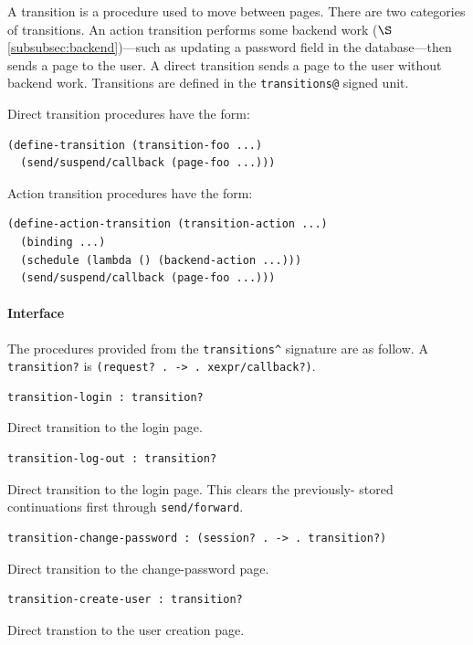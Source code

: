 \documentclass[a4paper]{article}
\begin{document}
A transition is a procedure used to move between pages. There are two categories
of transitions. An action transition performs some backend work
($\S$\ref{subsubsec:backend})---such as updating a password field in the
database---then sends a page to the user. A direct transition sends a page to
the user without backend work. Transitions are defined in the
\verb|transitions@| signed unit.

Direct transition procedures have the form:

\begin{verbatim}
(define-transition (transition-foo ...)
  (send/suspend/callback (page-foo ...)))
\end{verbatim}

Action transition procedures have the form:

\begin{verbatim}
(define-action-transition (transition-action ...)
  (binding ...)
  (schedule (lambda () (backend-action ...)))
  (send/suspend/callback (page-foo ...)))
\end{verbatim}

\paragraph{Interface}\label{para:transitions-interface}

The procedures provided from the \verb|transitions^| signature are as follow.
A \verb|transition?| is \verb|(request? . -> . xexpr/callback?)|.

\begin{verbatim}
transition-login : transition?
\end{verbatim}
Direct transition to the login page.

\begin{verbatim}
transition-log-out : transition?
\end{verbatim}
Direct transition to the login page. This clears the previously-
stored continuations first through \verb|send/forward|.

\begin{verbatim}
transition-change-password : (session? . -> . transition?)
\end{verbatim}
Direct transition to the change-password page.

\begin{verbatim}
transition-create-user : transition?
\end{verbatim}
Direct transtion to the user creation page.
\end{document}
